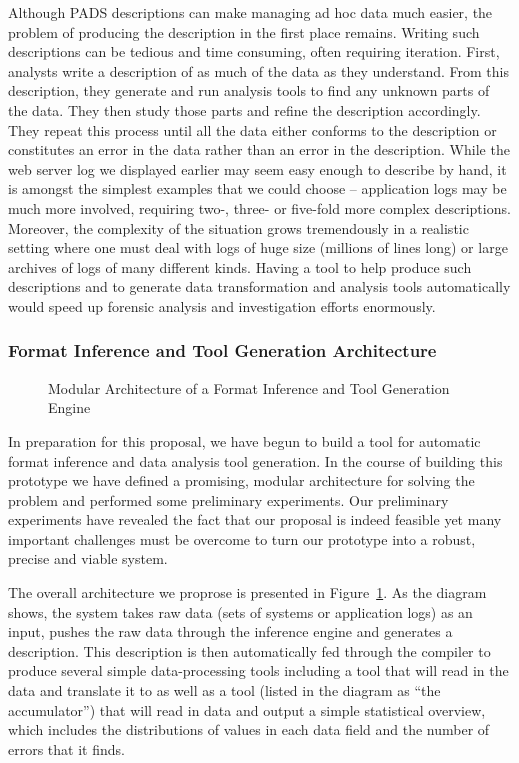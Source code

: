Although PADS descriptions can make managing ad hoc data much easier,
the problem of producing the description in the first place
remains. Writing such descriptions can be tedious and time consuming,
often requiring iteration. First, analysts write a description of as
much of the data as they understand. From this description, they
generate and run analysis tools to find any unknown parts of the
data. They then study those parts and refine the description
accordingly. They repeat this process until all the data either
conforms to the description or constitutes an error in the data rather
than an error in the description.  While the web server log we displayed
earlier may seem easy enough to describe by hand, it is amongst the
simplest examples that we could choose -- application logs may be much
more involved, requiring two-, three- or five-fold more complex descriptions.  
Moreover, the complexity of the situation grows tremendously in a realistic
setting where one must deal with logs of huge size (millions of lines long)
or large archives of logs of many different kinds. 
Having a tool to help produce such descriptions and to generate
data transformation and analysis tools automatically would speed up
forensic analysis and investigation efforts enormously.

\subsubsection*{Format Inference and Tool Generation Architecture}

\begin{figure}
\begin{center}
\centerline{}
\end{center}
\caption{Modular Architecture of a Format Inference and Tool Generation Engine}
\label{fig:format-inference-engine}
\end{figure}

In preparation for this proposal, we have begun to build a tool for
automatic format inference and data analysis tool generation.  In the
course of building this prototype we have defined a promising, modular
architecture for solving the problem and performed some preliminary
experiments.  Our preliminary experiments have revealed the fact that
our proposal is indeed feasible yet many important challenges must be
overcome to turn our prototype into a robust, precise and viable
system.

The overall architecture we proprose is presented in
Figure~\ref{fig:format-inference-engine}.  As the diagram shows, the
system takes raw data (sets of systems or application logs) as an
input, pushes the raw data through the inference engine and generates
a \pads{} description.  This description is then automatically fed
through the \pads{} compiler to produce several simple
data-processing tools including a tool that will read in the data and
translate it to \xml{} as well as a tool (listed in the diagram
as ``the accumulator'')
that will read in data and output a simple statistical overview,
which includes the distributions of values in each data field and
the number of errors that it finds.

